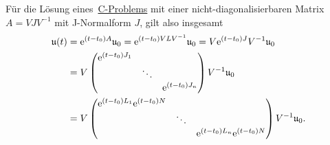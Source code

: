 \begin{remark*}
    Für die Lösung eines~\hyperref[eq:cp]{C-Problems} mit einer nicht-diagonalisierbaren Matrix $A = V J V^{-1}$
    mit J-Normalform $J$, gilt also insgesamt
    \begin{align*}
        \mathfrak{u}(t) &= \mathrm{e}^{(t - t_0) A} \mathfrak{u}_0 = \mathrm{e}^{(t - t_0) V L V^{-1}} \mathfrak{u}_0 = V \mathrm{e}^{(t - t_0) J} V^{-1} \mathfrak{u}_0\\
        &= V \begin{pmatrix}
                \mathrm{e}^{(t - t_0) J_1} &        & \\
                                   & \ddots & \\
                                   &        & \mathrm{e}^{(t - t_0) J_n}
            \end{pmatrix} V^{-1} \mathfrak{u}_0\\
        &= V \begin{pmatrix}
                \mathrm{e}^{(t - t_0) L_1} \mathrm{e}^{(t - t_0) N} &        & \\
                                                    & \ddots & \\
                                                    &        & \mathrm{e}^{(t - t_0) L_n} \mathrm{e}^{(t - t_0) N}
            \end{pmatrix} V^{-1} \mathfrak{u}_0.
    \end{align*}
\end{remark*}

